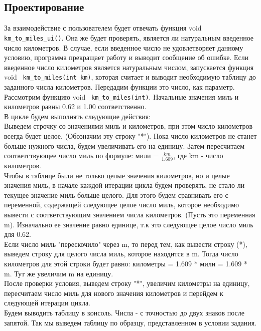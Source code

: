 \documentclass[12pt,a4paper]{report}
\begin{document}
\subsection{Проектирование}
За взаимодействие с пользователем будет отвечать функция void \verb+ km_to_miles_ui()+. Она же будет проверять, является ли натуральным введенное число километров. В случае, если введенное число не удовлетворяет данному условию, программа прекращает работу и выводит сообщение об ошибке. Если введенное число километров является натуральным числом, запускается функция void \verb+ km_to_miles(int km)+, которая считает и выводит необходимую таблицу до заданного числа километров. Передадим функции это число, как параметр. \\
Рассмотрим функцию void \verb+ km_to_miles(int)+. Начальные значения миль и километров равны 0.62 и 1.00 соответственно. \\
В цикле будем выполнять следующие действия: \\
Выведем строчку со значениями миль и километров, при этом число километров всегда будет целое. (Обозначим эту строку "*"). Пока число километров не станет больше нужного числа, будем увеличивать его на единицу. Затем пересчитаем соответствующее число миль по формуле: мили = $\frac{km}{1.609}$, где km - число километров. \\
Чтобы в таблице были не только целые значения километров, но и целые значения миль, в начале каждой итерации цикла будем проверять, не стало ли текущее значение миль больше целого. Для этого будем сравнивать его с переменной, содержащей следующее целое число миль, которое необходимо вывести с соответствующим значением числа километров. (Пусть это переменная m). Изначально ее значение равно единице, т.к это следующее целое число миль для 0.62. \\
Если число миль "перескочило" через m, то перед тем, как вывести строку (*), выведем строку для целого числа миль, которое находится в m. Тогда число километров для этой строки будет равно: километры = 1.609 * мили = 1.609 * m. Тут же увеличим m на единицу. \\
После проверки условия, выведем строку "*", увеличим километры на единицу, пересчитаем число миль для нового значения километров и перейдем к следующей итерации цикла.  \\
Будем выводить таблицу в консоль. Числа - с точностью до двух знаков после запятой. Так мы выведем таблицу по образцу, представленном в условии задания. 
\end{document}
